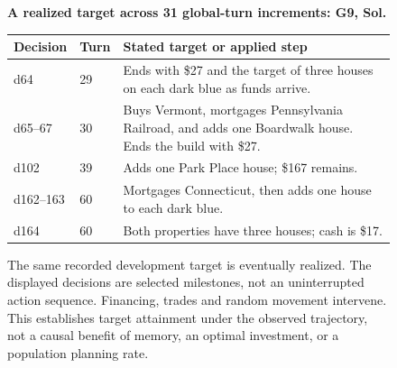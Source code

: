 
\begin{figure}[H]
\centering
\begin{minipage}{0.95\linewidth}
\textbf{A realized target across 31 global-turn increments: G9, Sol.}\par\smallskip
\begin{tabularx}{\linewidth}{@{}llX@{}}
\toprule
Decision & Turn & Stated target or applied step\\
\midrule
d64 & 29 & Ends with \$27 and the target of three houses on each dark blue as funds arrive.\\
d65--67 & 30 & Buys Vermont, mortgages Pennsylvania Railroad, and adds one Boardwalk house. Ends the build with \$27.\\
d102 & 39 & Adds one Park Place house; \$167 remains.\\
d162--163 & 60 & Mortgages Connecticut, then adds one house to each dark blue.\\
d164 & 60 & Both properties have three houses; cash is \$17.\\
\bottomrule
\end{tabularx}
\end{minipage}
\caption{The same recorded development target is eventually realized. The displayed decisions are selected milestones, not an uninterrupted action sequence. Financing, trades and random movement intervene. This establishes target attainment under the observed trajectory, not a causal benefit of memory, an optimal investment, or a population planning rate.}
\label{fig:temporal-target}
\end{figure}

